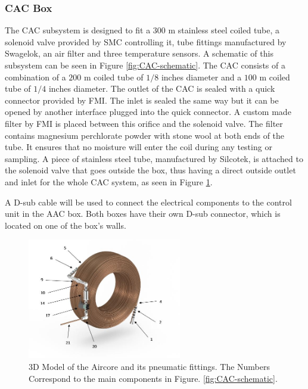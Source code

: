 \subsubsection{CAC Box}

The CAC subsystem is designed to fit a $300$ m stainless steel coiled tube, a solenoid valve provided by SMC controlling it, tube fittings manufactured by Swagelok, an air filter and three temperature sensors. A schematic of this subsystem can be seen in Figure \ref{fig:CAC-schematic}. The CAC consists of a combination of a $200$ m coiled tube of $1/8$ inches diameter and a $100$ m coiled tube of $1/4$ inches diameter. The outlet of the CAC is sealed with a quick connector provided by FMI. The inlet is sealed the same way but it can be opened by another interface plugged into the quick connector. A custom made filter by FMI is placed between this orifice and the solenoid valve. The filter contains magnesium perchlorate powder with stone wool at both ends of the tube. It ensures that no moisture will enter the coil during any testing or sampling. A piece of stainless steel tube, manufactured by Silcotek, is attached to the solenoid valve that goes outside the box, thus having a direct outside outlet and inlet for the whole CAC system, as seen in Figure \ref{fig:CAC-cad-model}.

A D-sub cable will be used to connect the electrical components to the control unit in the AAC box. Both boxes have their own D-sub connector, which is located on one of the box's walls.


\begin{figure}[H]
    \centering
    \includegraphics[width=0.6\textwidth]{4-experiment-design/img/Mechanical/CAC_labels.jpg}
    \caption{3D Model of the Aircore and its pneumatic fittings. The Numbers Correspond to the main components in Figure. \ref{fig:CAC-schematic}.}
    \label{fig:CAC-cad-model}
\end{figure}

